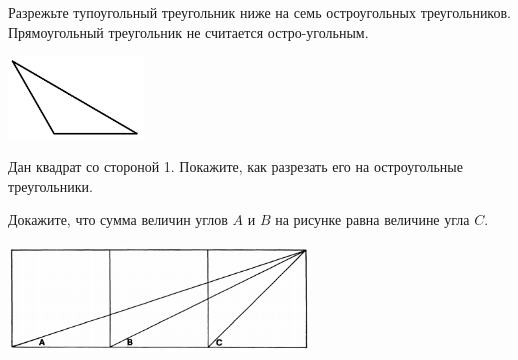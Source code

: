 ﻿
\begin{itemize}

\itA Разрежьте тупоугольный треугольник ниже на семь остроугольных треугольников. Прямоугольный треугольник не считается остро-\linebreak угольным.

\begin{center}
	\includegraphics[width=3.6cm]{stats/2017/images/z_obtuse.png}
\end{center}

\itB Дан квадрат со стороной \SI{1}{}. Покажите, как разрезать его на остроугольные треугольники.

\itC Докажите, что сумма величин углов $A$ и $B$ на рисунке равна величине угла $C$.

\begin{center}
	\includegraphics[width=8cm]{stats/2017/images/z_threesquares.png}
\end{center}
\end{itemize}